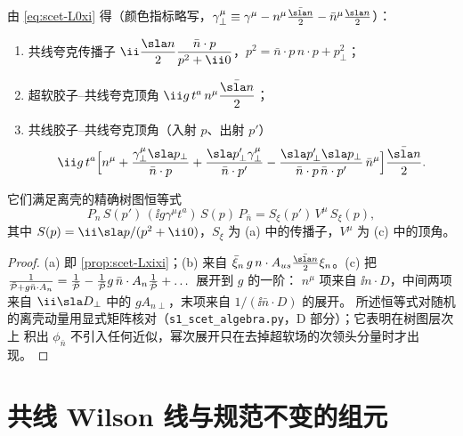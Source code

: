 \begin{proposition}\tagR\label{prop:scet-feynman}
由 \cref{eq:scet-L0xi} 得（颜色指标略写，$\gamma_\perp^\mu\equiv\gamma^\mu-n^\mu\frac{\nbslash}{2}-\bar n^\mu\frac{\nslash}{2}$）：
\begin{enumerate}[label=(\alph*)]
\item 共线夸克传播子 $\ii\dfrac{\nslash}{2}\dfrac{\bar n\cdot p}{p^2+\ii0}$，$p^2=\bar n\cdot p\,n\cdot p+p_\perp^2$；
\item 超软胶子–共线夸克顶角 $\ii g\,t^a\,n^\mu\dfrac{\nbslash}{2}$；
\item 共线胶子–共线夸克顶角（入射 $p$、出射 $p'$）
\begin{equation}\label{eq:scet-collvertex}
\ii g\,t^a\Big[n^\mu+\frac{\gamma_\perp^\mu\sla p_\perp}{\bar n\cdot p}+\frac{\sla p'_\perp\gamma_\perp^\mu}{\bar n\cdot p'}
-\frac{\sla p'_\perp\sla p_\perp}{\bar n\cdot p\,\bar n\cdot p'}\,\bar n^\mu\Big]\frac{\nbslash}{2}.
\end{equation}
\end{enumerate}
它们满足离壳的精确树图恒等式
\[
P_n\,S(p')\,(\ii g\gamma^\mu t^a)\,S(p)\,P_{\bar n}=S_\xi(p')\,V^\mu\,S_\xi(p),
\]
其中 $S(p)=\ii\sla p/(p^2+\ii0)$，$S_\xi$ 为 (a) 中的传播子，$V^\mu$ 为 (c) 中的顶角。
\end{proposition}

\begin{proof}
(a) 即 \cref{prop:scet-Lxixi}；(b) 来自 $\bar\xi_n\,g\,n\cdot A_{us}\frac{\nbslash}{2}\xi_n$。(c) 把
$\frac{1}{\bar{\mathcal P}+g\bar n\cdot A_n}=\frac1{\bar{\mathcal P}}-\frac1{\bar{\mathcal P}}g\,\bar n\cdot A_n\frac1{\bar{\mathcal P}}+\dots$ 展开到 $g$ 的一阶：
$n^\mu$ 项来自 $\ii n\cdot D$，中间两项来自 $\ii\sla D_\perp$ 中的 $gA_{n\perp}$，末项来自 $1/(\ii\bar n\cdot D)$ 的展开。
所述恒等式对随机的离壳动量用显式矩阵核对（\texttt{s1\_\allowbreak scet\_\allowbreak algebra.py}，D 部分）；它表明在树图层次上
积出 $\phi_{\bar n}$ 不引入任何近似，幂次展开只在去掉超软场的次领头分量时才出现。
\end{proof}

\section{共线 Wilson 线与规范不变的组元}\label{sec:scet-wilson}

